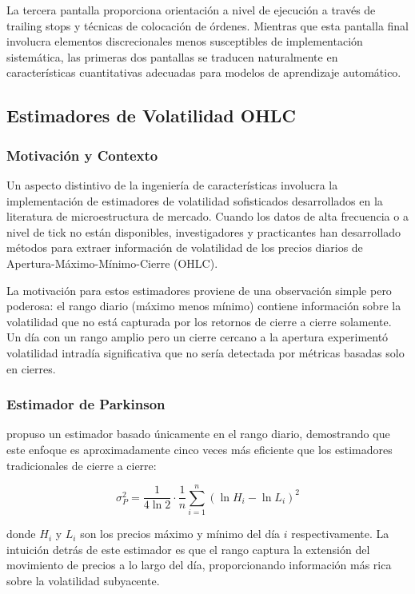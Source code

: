 \documentclass[11pt,a4paper]{article}
\begin{document}
La tercera pantalla proporciona orientación a nivel de ejecución a través de trailing stops y técnicas de colocación de órdenes. Mientras que esta pantalla final involucra elementos discrecionales menos susceptibles de implementación sistemática, las primeras dos pantallas se traducen naturalmente en características cuantitativas adecuadas para modelos de aprendizaje automático.

\subsection{Estimadores de Volatilidad OHLC}

\subsubsection{Motivación y Contexto}

Un aspecto distintivo de la ingeniería de características involucra la implementación de estimadores de volatilidad sofisticados desarrollados en la literatura de microestructura de mercado. Cuando los datos de alta frecuencia o a nivel de tick no están disponibles, investigadores y practicantes han desarrollado métodos para extraer información de volatilidad de los precios diarios de Apertura-Máximo-Mínimo-Cierre (OHLC).

La motivación para estos estimadores proviene de una observación simple pero poderosa: el rango diario (máximo menos mínimo) contiene información sobre la volatilidad que no está capturada por los retornos de cierre a cierre solamente. Un día con un rango amplio pero un cierre cercano a la apertura experimentó volatilidad intradía significativa que no sería detectada por métricas basadas solo en cierres.

\subsubsection{Estimador de Parkinson}

\citet{parkinson1980} propuso un estimador basado únicamente en el rango diario, demostrando que este enfoque es aproximadamente cinco veces más eficiente que los estimadores tradicionales de cierre a cierre:

\begin{equation}
\sigma_P^2 = \frac{1}{4\ln 2} \cdot \frac{1}{n}\sum_{i=1}^{n}(\ln H_i - \ln L_i)^2
\end{equation}

donde $H_i$ y $L_i$ son los precios máximo y mínimo del día $i$ respectivamente. La intuición detrás de este estimador es que el rango captura la extensión del movimiento de precios a lo largo del día, proporcionando información más rica sobre la volatilidad subyacente.
\end{document}

